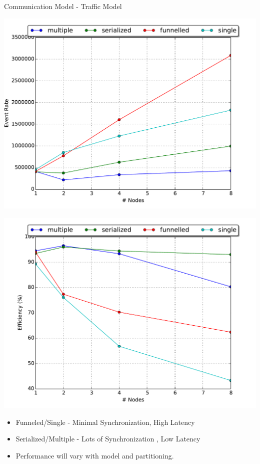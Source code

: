 \documentclass[10pt]{beamer}
\begin{document}
\begin{frame}{Communication Model - Traffic Model}
    \begin{minipage}{0.5\textwidth}
        \includegraphics[width=\textwidth]{../figs/partitioning_communication/communication_traffic_eventrate.pdf}
    \end{minipage}%
    \begin{minipage}{0.5\textwidth}
        \includegraphics[width=\textwidth]{../figs/partitioning_communication/communication_traffic_efficiency.pdf}
    \end{minipage}
    \begin{itemize}
        \item Funneled/Single - Minimal Synchronization, High Latency
        \item Serialized/Multiple - Lots of Synchronization , Low Latency
        \item Performance will vary with model and partitioning.
    \end{itemize}
\end{frame}
\end{document}
